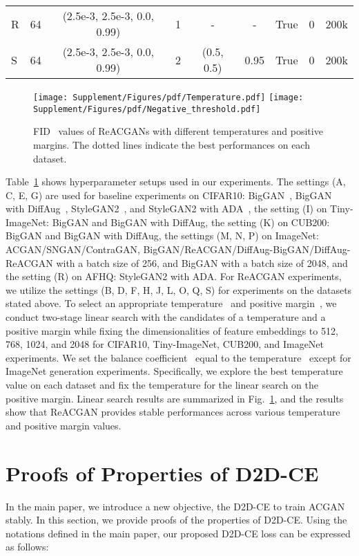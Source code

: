 \documentclass{article}
\begin{document}
\begin{table}[!ht]
{\begin{tabular}{lcccccccc}
\midrule
R & 64 & (2.5e-3, 2.5e-3, 0.0, 0.99) & 1 & - & - & True & 0 &  200k\\
S & 64 & (2.5e-3, 2.5e-3, 0.0, 0.99) & 2 & (0.5, 0.5) & 0.95 & True & 0 &  200k\\
\cmidrule[1.0pt]{1-9}
\end{tabular}}
\label{table:hyper}
\end{table} \begin{figure}[ht]
    \vspace{-1mm}
    \centering
    \texttt{[image: Supplement/Figures/pdf/Temperature.pdf]}
    \texttt{[image: Supplement/Figures/pdf/Negative\_threshold.pdf]}
    \caption{FID~\cite{Heusel2017GANsTB} values of ReACGANs with different temperatures and positive margins. The dotted lines indicate the best performances on each dataset.}
    \label{fig:gridsearch}
\end{figure} Table~\ref{table:hyper} shows hyperparameter setups used in our experiments. The settings (A, C, E, G) are used for baseline experiments on CIFAR10: BigGAN~\cite{Brock2019LargeSG}, BigGAN with DiffAug~\cite{zhao2020differentiable}, StyleGAN2~\cite{karras2020analyzing}, and StyleGAN2 with ADA~\cite{Karras2020TrainingGA}, the setting (I) on Tiny-ImageNet: BigGAN and BigGAN with DiffAug, the setting (K) on CUB200: BigGAN and BigGAN with DiffAug, the settings (M, N, P) on ImageNet: ACGAN/SNGAN/ContraGAN, BigGAN/ReACGAN/DiffAug-BigGAN/DiffAug-ReACGAN with a batch size of 256, and BigGAN with a batch size of 2048, and the setting (R) on AFHQ: StyleGAN2 with ADA. For ReACGAN experiments, we utilize the settings (B, D, F, H, J, L, O, Q, S) for experiments on the datasets stated above. To select an appropriate temperature~ and positive margin~, we conduct two-stage linear search with the candidates of a temperature  and a positive margin  while fixing the dimensionalities of feature embeddings to 512, 768, 1024, and 2048 for CIFAR10, Tiny-ImageNet, CUB200, and ImageNet experiments. We set the balance coefficient~ equal to the temperature~ except for ImageNet generation experiments. Specifically, we explore the best temperature value on each dataset and fix the temperature for the linear search on the positive margin.
Linear search results are summarized in Fig.~\ref{fig:gridsearch}, and the results show that ReACGAN provides stable performances across various temperature and positive margin values. \section{Proofs of Properties of D2D-CE}
\label{proof_of_D2DCE}
In the main paper, we introduce a new objective, the D2D-CE to train ACGAN stably. In this section, we provide proofs of the properties of D2D-CE. Using the notations defined in the main paper, our proposed D2D-CE loss can be expressed as follows:
\end{document}
